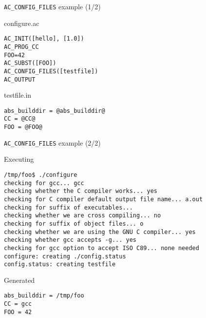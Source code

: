 \begin{frame}[fragile]{{\tt AC\_CONFIG\_FILES} example (1/2)}

\begin{block}{configure.ac}
\begin{verbatim}
AC_INIT([hello], [1.0])
AC_PROG_CC
FOO=42
AC_SUBST([FOO])
AC_CONFIG_FILES([testfile])
AC_OUTPUT
\end{verbatim}
\end{block}

\begin{block}{testfile.in}
\begin{verbatim}
abs_builddir = @abs_builddir@
CC = @CC@
FOO = @FOO@
\end{verbatim}
\end{block}

\end{frame}

\begin{frame}[fragile]{{\tt AC\_CONFIG\_FILES} example (2/2)}

\begin{block}{Executing }
\begin{verbatim}
/tmp/foo$ ./configure
checking for gcc... gcc
checking whether the C compiler works... yes
checking for C compiler default output file name... a.out
checking for suffix of executables... 
checking whether we are cross compiling... no
checking for suffix of object files... o
checking whether we are using the GNU C compiler... yes
checking whether gcc accepts -g... yes
checking for gcc option to accept ISO C89... none needed
configure: creating ./config.status
config.status: creating testfile
\end{verbatim}
\end{block}

\begin{block}{Generated }
\begin{verbatim}
abs_builddir = /tmp/foo
CC = gcc
FOO = 42
\end{verbatim}
\end{block}

\end{frame}

